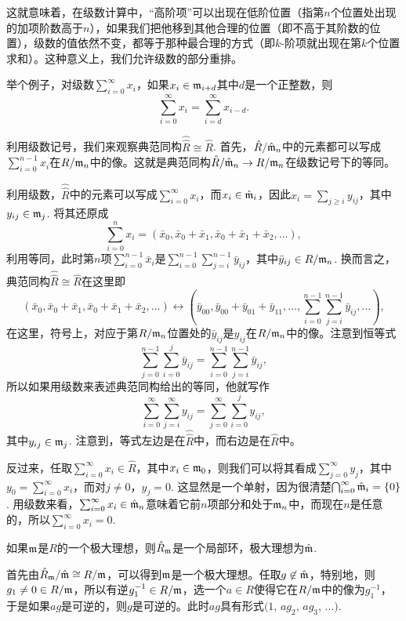 这就意味着，在级数计算中，“高阶项”可以出现在低阶位置（指第$n$个位置处出现的加项阶数高于$n$），如果我们把他移到其他合理的位置（即不高于其阶数的位置），级数的值依然不变，都等于那种最合理的方式（即$k$-阶项就出现在第$k$个位置求和）。这种意义上，我们允许级数的部分重排。

举个例子，对级数$\sum_{i=0}^\infty x_i$，如果$x_i\in \mathfrak{m}_{i+d}$其中$d$是一个正整数，则
\[
	\sum_{i=0}^\infty x_i=\sum_{i=d}^\infty x_{i-d}.
\]

\para 利用级数记号，我们来观察典范同构$\hat{\hat R}\cong \hat{R}$. 首先，$\hat R/\hat {\mathfrak{m}}_n$中的元素都可以写成$\sum_{i=0}^{n-1}x_i$在$R/\mathfrak{m}_n$中的像。这就是典范同构$\hat R/\hat {\mathfrak{m}}_n \to R/\mathfrak{m}_n$在级数记号下的等同。

利用级数，$\hat{\hat R}$中的元素可以写成$\sum_{i=0}^\infty x_i$，而$x_i\in \hat {\mathfrak{m}}_i$，因此$x_i=\sum_{j\geq i}y_{ij}$，其中$y_{ij}\in \mathfrak{m}_j$. 将其还原成
\[
	\sum_{i=0}^nx_i=(\bar{x}_0,\bar{x}_0+\bar{x}_1,\bar{x}_0+\bar{x}_1+\bar{x}_2,\dots),
\]
利用等同，此时第$n$项$\sum_{i=0}^{n-1}\bar{x}_i$是$\sum_{i=0}^{n-1}\sum_{j=i}^{n-1} \bar{y}_{ij}$，其中$\bar{y}_{ij}\in R/\mathfrak{m}_n$. 换而言之，典范同构$\hat{\hat R}\cong \hat{R}$在这里即
\[
	(\bar{x}_0,\bar{x}_0+\bar{x}_1,\bar{x}_0+\bar{x}_1+\bar{x}_2,\dots)\leftrightarrow\left(\bar{y}_{00},\bar{y}_{00}+\bar{y}_{01}+\bar{y}_{11},\dots,\sum_{i=0}^{n-1}\sum_{j=i}^{n-1} \bar{y}_{ij},\dots\right),
\]
在这里，符号上，对应于第$R/\mathfrak{m}_n$位置处的$\bar{y}_{ij}$是$y_{ij}$在$R/\mathfrak{m}_n$中的像。注意到恒等式
\[
	\sum_{j=0}^{n-1}\sum_{i=0}^{j} \bar{y}_{ij}=\sum_{i=0}^{n-1}\sum_{j=i}^{n-1} \bar{y}_{ij},
\]
所以如果用级数来表述典范同构给出的等同，他就写作
\[
	\sum_{i=0}^\infty \sum_{j=i}^\infty y_{ij}=\sum_{j=0}^\infty \sum_{i=0}^jy_{ij},
\]
其中$y_{ij}\in \mathfrak{m}_j$. 注意到，等式左边是在$\hat{\hat R}$中，而右边是在$\hat R$中。

反过来，任取$\sum_{i=0}^\infty x_i\in \hat{R}$，其中$x_i\in \mathfrak{m}_0$，则我们可以将其看成$\sum_{j=0}^\infty y_j$，其中$y_0=\sum_{i=0}^\infty x_i$，而对$j\neq 0$，$y_j=0$. 这显然是一个单射，因为很清楚$\bigcap_{i=0}^\infty \hat{\mathfrak{m}}_i =\{0\}$. 用级数来看，$\sum_{i=0}^\infty x_i \in \hat{\mathfrak{m}}_n$意味着它前$n$项部分和处于$\mathfrak{m}_n$中，而现在$n$是任意的，所以$\sum_{i=0}^\infty x_i=0$.

\pro 如果$\mathfrak{m}$是$R$的一个极大理想，则$\hat R_{\mathfrak{m}}$是一个局部环，极大理想为$\hat{\mathfrak{m}}$.

\proof
	首先由$\hat R_{\mathfrak{m}}/\hat{\mathfrak{m}}\cong R/\mathfrak{m}$，可以得到$\mathfrak{m}$是一个极大理想。任取$g\not\in \hat {\mathfrak{m}}$，特别地，则$g_1\neq 0 \in R/\mathfrak{m}$，所以有逆$g_1^{-1}\in R/\mathfrak{m}$，选一个$a\in R$使得它在$R/\mathfrak{m}$中的像为$g_1^{-1}$，于是如果$ag$是可逆的，则$g$是可逆的。此时$ag$具有形式$(1$, $ag_2$, $ag_3$, $\dots)$.

